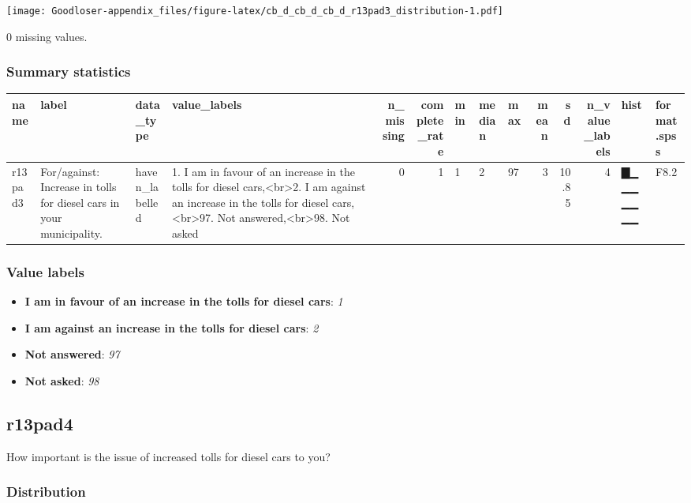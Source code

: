 \documentclass[
]{book}
\providecommand{\tightlist}{%
  \setlength{\itemsep}{0pt}\setlength{\parskip}{0pt}}
\begin{document}
\texttt{[image: Goodloser-appendix\_files/figure-latex/cb\_d\_cb\_d\_cb\_d\_r13pad3\_distribution-1.pdf]}

0 missing values.

\hypertarget{r13pad3_summary}{%
\subsubsection{Summary statistics}\label{r13pad3_summary}}

\begin{tabular}{l|l|l|l|r|r|l|l|l|r|r|r|l|l}
\hline
name & label & data_type & value_labels & n_missing & complete_rate & min & median & max & mean & sd & n_value_labels & hist & format.spss\\
\hline
r13pad3 & For/against: Increase in tolls for diesel cars in your municipality. & haven_labelled & 1. I am in favour of an increase in the tolls for diesel cars,<br>2. I am against an increase in the tolls for diesel cars,<br>97. Not answered,<br>98. Not asked & 0 & 1 & 1 & 2 & 97 & 3 & 10.85 & 4 & ▇▁▁▁▁▁▁▁ & F8.2\\
\hline
\end{tabular}

\hypertarget{r13pad3_labels}{%
\subsubsection{Value labels}\label{r13pad3_labels}}

\begin{itemize}
\tightlist
\item
  \textbf{I am in favour of an increase in the tolls for diesel cars}: \emph{1}
\item
  \textbf{I am against an increase in the tolls for diesel cars}: \emph{2}
\item
  \textbf{Not answered}: \emph{97}
\item
  \textbf{Not asked}: \emph{98}
\end{itemize}

\hypertarget{r13pad4}{%
\subsection{r13pad4}\label{r13pad4}}

How important is the issue of increased tolls for diesel cars to you?

\hypertarget{r13pad4_distribution}{%
\subsubsection{Distribution}\label{r13pad4_distribution}}
\end{document}

